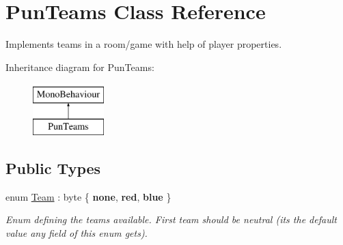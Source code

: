 \hypertarget{class_pun_teams}{}\section{Pun\+Teams Class Reference}
\label{class_pun_teams}


Implements teams in a room/game with help of player properties.  


Inheritance diagram for Pun\+Teams\+:\begin{figure}[H]
\begin{center}
\leavevmode
\includegraphics[height=2.000000cm]{class_pun_teams}
\end{center}
\end{figure}
\subsection*{Public Types}
\begin{DoxyCompactItemize}
\item 
enum \hyperlink{class_pun_teams_a933d84000474f43931805990b241a2a7}{Team} \+: byte \{ {\bfseries none}, 
{\bfseries red}, 
{\bfseries blue}
 \}\begin{DoxyCompactList}\small\item\em Enum defining the teams available. First team should be neutral (it\textquotesingle{}s the default value any field of this enum gets).\end{DoxyCompactList}
\end{DoxyCompactItemize}
